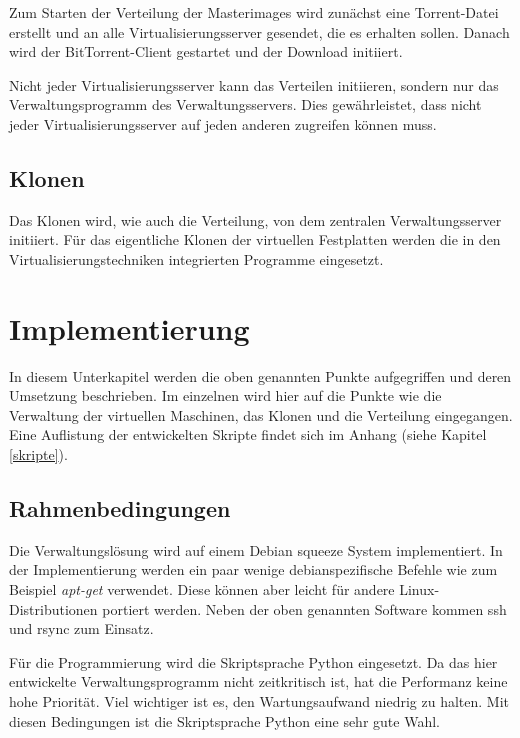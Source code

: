 Zum Starten der Verteilung der Masterimages wird zunächst eine Torrent-Datei erstellt und an alle Virtualisierungsserver gesendet, die es erhalten sollen. Danach wird der BitTorrent-Client gestartet und der Download initiiert.

Nicht jeder Virtualisierungsserver kann das Verteilen initiieren, sondern nur das Verwaltungsprogramm des Verwaltungsservers. Dies gewährleistet, dass nicht jeder Virtualisierungsserver auf jeden anderen zugreifen können muss.

\subsection{Klonen}
Das Klonen wird, wie auch die Verteilung, von dem zentralen Verwaltungsserver initiiert. Für das eigentliche Klonen der virtuellen Festplatten werden die in den Virtualisierungstechniken integrierten Programme eingesetzt. 

\section{Implementierung}
In diesem Unterkapitel werden die oben genannten Punkte aufgegriffen und deren Umsetzung beschrieben. Im einzelnen wird hier auf die Punkte wie die Verwaltung der virtuellen Maschinen, das Klonen und die Verteilung eingegangen. Eine Auflistung der entwickelten Skripte findet sich im Anhang (siehe Kapitel \ref{skripte}).

\subsection{Rahmenbedingungen}
Die Verwaltungslösung wird auf einem Debian squeeze System implementiert. In der Implementierung werden ein paar wenige debianspezifische Befehle wie zum Beispiel \textit{apt-get} verwendet. Diese können aber leicht für andere Linux-Distributionen portiert werden. Neben der oben genannten Software kommen ssh und rsync zum Einsatz.

Für die Programmierung wird die Skriptsprache Python eingesetzt. Da das hier entwickelte Verwaltungsprogramm nicht zeitkritisch ist, hat die Performanz keine hohe Priorität. Viel wichtiger ist es, den Wartungsaufwand niedrig zu halten. Mit diesen Bedingungen ist die Skriptsprache Python eine sehr gute Wahl.

